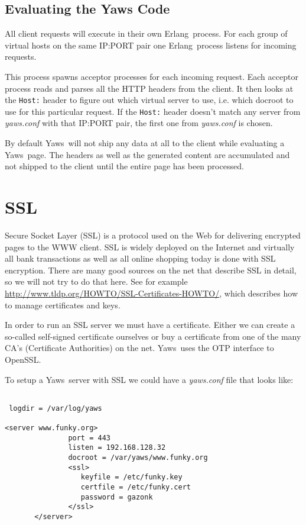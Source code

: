 \documentclass[11pt,oneside,english]{book}
\newcommand{\Erlang}            %
        {{\sc Erlang}}
\newcommand{\Yaws}            %
        {{\sc Yaws}}
\begin{document}
\section{Evaluating the Yaws Code}

All client requests will execute in their own \Erlang\  process.
For each group of virtual hosts on the same IP:PORT pair
one \Erlang\  process listens for incoming requests.

This process spawns acceptor processes for each incoming request.
Each acceptor process reads and parses all the HTTP headers from the
client. It then looks at the \verb+Host:+ header to figure out which
virtual server to use, i.e. which docroot to use for this particular
request. If the \verb+Host:+ header doesn't match any server from
\textit{yaws.conf} with that IP:PORT pair, the first one from
\textit{yaws.conf} is chosen.

By default \Yaws\  will not ship any data at all to the client
while evaluating a \Yaws\  page. The headers as well as the generated
content are accumulated and not shipped to the client until the
entire page has been processed.


\chapter{SSL}

Secure Socket Layer (SSL) is a protocol used on the Web for delivering
encrypted pages to the WWW client. SSL is widely deployed on the
Internet and virtually all bank transactions as well as all online
shopping today is done with SSL encryption. There are many good
sources on the net that describe SSL in detail, so we will not try to
do that here.  See for example
\url{http://www.tldp.org/HOWTO/SSL-Certificates-HOWTO/}, which
describes how to manage certificates and keys.

In order to run an SSL server we must have a certificate. Either we
can create a so-called self-signed certificate ourselves or buy a
certificate from one of the many CA's (Certificate Authorities) on the
net. \Yaws\  uses the OTP interface to OpenSSL.

To setup a \Yaws\ server with SSL we could have a \textit{yaws.conf}
file that looks like:

\begin{verbatim}

 logdir = /var/log/yaws

<server www.funky.org>
               port = 443
               listen = 192.168.128.32
               docroot = /var/yaws/www.funky.org
               <ssl>
                  keyfile = /etc/funky.key
                  certfile = /etc/funky.cert
                  password = gazonk
               </ssl>
       </server>
\end{verbatim}
\end{document}
